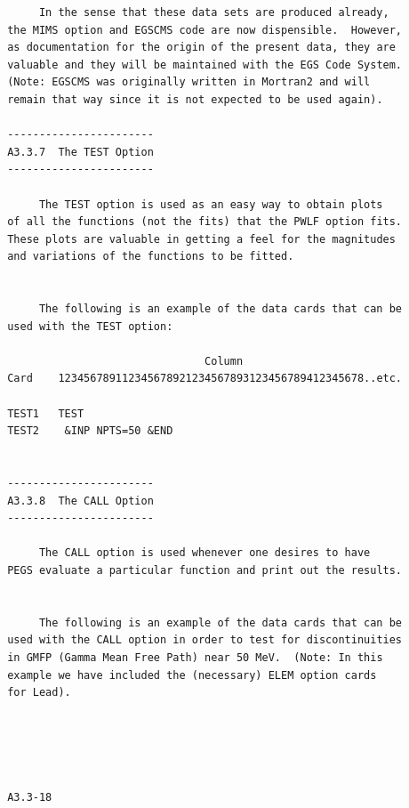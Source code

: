 \newpage {} \begin{verbatim}
      In the sense that these data sets are produced already,
 the MIMS option and EGSCMS code are now dispensible.  However,
 as documentation for the origin of the present data, they are
 valuable and they will be maintained with the EGS Code System.
 (Note: EGSCMS was originally written in Mortran2 and will
 remain that way since it is not expected to be used again).
 
 -----------------------
 A3.3.7  The TEST Option
 -----------------------
 
      The TEST option is used as an easy way to obtain plots
 of all the functions (not the fits) that the PWLF option fits.
 These plots are valuable in getting a feel for the magnitudes
 and variations of the functions to be fitted.
 
 
      The following is an example of the data cards that can be
 used with the TEST option:
 
                                Column
 Card    123456789112345678921234567893123456789412345678..etc.
 
 TEST1   TEST
 TEST2    &INP NPTS=50 &END
 
 
 -----------------------
 A3.3.8  The CALL Option
 -----------------------
 
      The CALL option is used whenever one desires to have
 PEGS evaluate a particular function and print out the results.
 
 
      The following is an example of the data cards that can be
 used with the CALL option in order to test for discontinuities
 in GMFP (Gamma Mean Free Path) near 50 MeV.  (Note: In this
 example we have included the (necessary) ELEM option cards
 for Lead).
 




 A3.3-18
\end{verbatim} 
\newpage {} 
